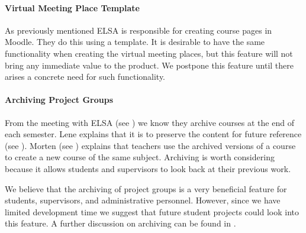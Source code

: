 \paragraph{Virtual Meeting Place Template}
As previously mentioned ELSA is responsible for creating course pages in Moodle. 
They do this using a template. 
It is desirable to have the same functionality when creating the virtual meeting places, but this feature will not bring any immediate value to the product. 
We postpone this feature until there arises a concrete need for such functionality.

\paragraph{Archiving Project Groups}
\label{sub:analysarchiving}
From the meeting with ELSA (see ) we know they archive courses at the end of each semester. 
Lene explains that it is to preserve the content for future reference (see ). 
Morten (see ) explains that teachers use the archived versions of a course to create a new course of the same subject. 
Archiving is worth considering because it allows students and supervisors to look back at their previous work.

We believe that the archiving of project groups is a very beneficial feature for students, supervisors, and administrative personnel.
However, since we have limited development time we suggest that future student projects could look into this feature.
A further discussion on archiving can be found in .


